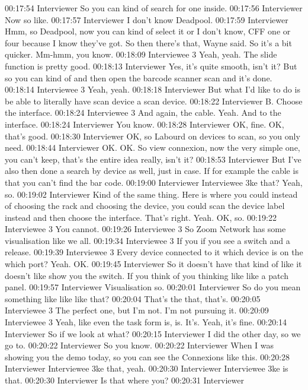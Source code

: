 00:17:54 Interviewer
So you can kind of search for one inside.
00:17:56 Interviewer
Now so like.
00:17:57 Interviewer
I don't know Deadpool.
00:17:59 Interviewer
Hmm, so Deadpool, now you can kind of select it or I don't know, CFF one or four because I know they've got. So then there's that, Wayne said. So it's a bit quicker. Mm-hmm, you know.
00:18:09 Interviewee 3
Yeah, yeah. The slide function is pretty good.
00:18:13 Interviewer
Yes, it's quite smooth, isn't it? But so you can kind of and then open the barcode scanner scan and it's done.
00:18:14 Interviewee 3
Yeah, yeah.
00:18:18 Interviewer
But what I'd like to do is be able to literally have scan device a scan device.
00:18:22 Interviewer
B. Choose the interface.
00:18:24 Interviewee 3
And again, the cable. Yeah. And to the interface.
00:18:24 Interviewer
You know.
00:18:28 Interviewer
OK, fine. OK, that's good.
00:18:30 Interviewer
OK, so Labourd on devices to scan, so you only need.
00:18:44 Interviewer
OK. OK. So view connexion, now the very simple one, you can't keep, that's the entire idea really, isn't it?
00:18:53 Interviewer
But I've also then done a search by device as well, just in case. If for example the cable is that you can't find the bar code.
00:19:00 Interviewer
Interviewee 3ke that? Yeah, so.
00:19:02 Interviewer
Kind of the same thing. Here is where you could instead of choosing the rack and choosing the device, you could scan the device label instead and then choose the interface. That's right. Yeah. OK, so.
00:19:22 Interviewee 3
You cannot.
00:19:26 Interviewee 3
So Zoom Network has some visualisation like we all.
00:19:34 Interviewee 3
If you if you see a switch and a release.
00:19:39 Interviewee 3
Every device connected to it which device is on the which port? Yeah. OK.
00:19:45 Interviewer
So it doesn't have that kind of like it doesn't like show you the switch. If you think of you thinking like like a patch panel.
00:19:57 Interviewer
Visualisation so.
00:20:01 Interviewer
So do you mean something like like like that?
00:20:04
That's the that, that's.
00:20:05 Interviewee 3
The perfect one, but I'm not. I'm not pursuing it.
00:20:09 Interviewee 3
Yeah, like even the task form is, is. It's. Yeah, it's fine.
00:20:14 Interviewer
So if we look at what?
00:20:15 Interviewer
I did the other day, so we go to.
00:20:22 Interviewer
So you know.
00:20:22 Interviewer
When I was showing you the demo today, so you can see the Connexions like this.
00:20:28 Interviewer
Interviewee 3ke that, yeah.
00:20:30 Interviewer
Interviewee 3ke is that.
00:20:30 Interviewer
Is that where you?
00:20:31 Interviewer
